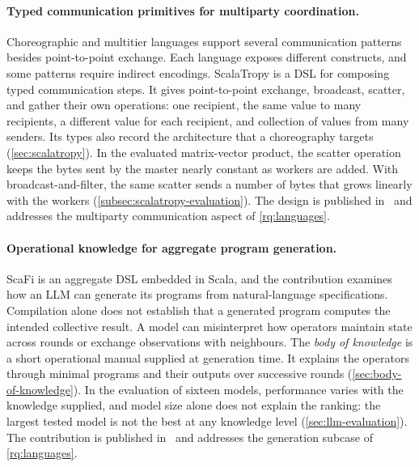 \paragraph{Typed communication primitives for multiparty coordination.}
Choreographic and multitier languages support several communication patterns besides point-to-point exchange.
%
Each language exposes different constructs,
and some patterns require indirect encodings.
%
ScalaTropy is a \ac{DSL} for composing typed communication steps.
It gives point-to-point exchange, broadcast, scatter, and gather their own operations:
one recipient, the same value to many recipients, a different value for each recipient, and collection of values from many senders.
%
Its types also record the architecture that a choreography targets (\cref{sec:scalatropy}).
%
In the evaluated matrix-vector product, the scatter operation keeps the bytes sent by the master nearly constant as workers are added.
%
With broadcast-and-filter, the same scatter sends a number of bytes that grows linearly with the workers (\cref{subsec:scalatropy-evaluation}).
%
The design is published in~\cite{Farabegoli:2026:ScalaTropy}
and addresses the multiparty communication aspect of \cref{rq:languages}.

\paragraph{Operational knowledge for aggregate program generation.}
ScaFi is an aggregate \ac{DSL} embedded in Scala,
and the contribution examines how an \ac{LLM} can generate its programs from natural-language specifications.
%
Compilation alone does not establish that a generated program computes the intended collective result.
A model can misinterpret how operators maintain state across rounds or exchange observations with neighbours.
%
The \emph{body of knowledge} is a short operational manual supplied at generation time.
It explains the operators through minimal programs and their outputs over successive rounds (\cref{sec:body-of-knowledge}).
%
In the evaluation of sixteen models, performance varies with the knowledge supplied,
and model size alone does not explain the ranking:
the largest tested model is not the best at any knowledge level (\cref{sec:llm-evaluation}).
%
The contribution is published in~\cite{DBLP:journals/tiot/AguzziFV25}
and addresses the generation subcase of \cref{rq:languages}.

